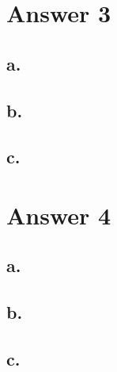 \documentclass[12pt]{article}
\begin{document}
\section*{Answer 3}


\subsection*{a.}

\subsection*{b.}

\subsection*{c.}




\section*{Answer 4}

\subsection*{a.}

\subsection*{b.}

\subsection*{c.}
\end{document}
